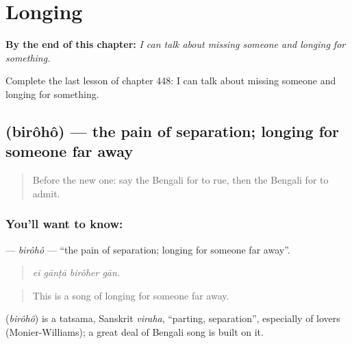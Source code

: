 
\chapter{Longing}
\label{ch:bn-longing}

\begin{chapteropening}
\textbf{By the end of this chapter:} \emph{I can talk about missing someone and longing for something.}

Complete the last lesson of chapter 448: I can talk about missing someone and longing for something.
\end{chapteropening}

\section[\texorpdfstring{\bn{বিরহ} (birôhô)}{বিরহ (birôhô)}]{ (birôhô) — the pain of separation; longing for someone far away}

\label{lesson:BN-C448-biroho}



\begin{quote}
Before the new one: say the Bengali for to rue, then the Bengali for to admit.
\end{quote}

\subsection*{You'll want to know: }
\textbf{} — \emph{birôhô} — \textquotedblleft{}the pain of separation; longing for someone far away\textquotedblright{}.

\begin{quote}
   
\end{quote}

\begin{quote}
\emph{ei gānṭā birôher gān.}
\end{quote}

\begin{quote}
This is a song of longing for someone far away.
\end{quote}

\begin{cousinweb}
\textbf{} (\emph{birôhô}) is a tatsama, Sanskrit \emph{viraha}, \textquotedblleft{}parting, separation\textquotedblright{}, especially of lovers (Monier-Williams); a great deal of Bengali song is built on it.
\end{cousinweb}

